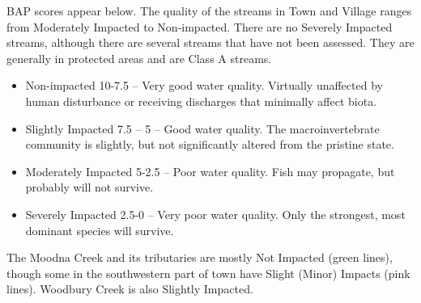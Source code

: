 BAP scores appear below. The quality of the streams in Town and Village ranges 
from Moderately Impacted to Non-impacted. There are no Severely Impacted 
streams, although there are several streams that have not been assessed. They 
are generally in protected areas and are Class A streams.
\begin{itemize}
    \item Non-impacted 10-7.5 – Very good water quality. Virtually unaffected 
    by human disturbance or receiving discharges that minimally affect 
    biota.
    \item Slightly Impacted 7.5 – 5 – Good water quality. The 
    macroinvertebrate community is slightly, but not significantly altered from 
    the pristine state.
    \item Moderately Impacted 5-2.5 – Poor water quality. Fish may propagate, 
    but probably will not survive.
    \item Severely Impacted 2.5-0 – Very poor water quality. Only the 
    strongest, most dominant species will survive.
\end{itemize}

The Moodna Creek and its tributaries are mostly Not Impacted (green lines), 
though some in the southwestern part of town have Slight (Minor) Impacts (pink 
lines). Woodbury Creek is also Slightly Impacted.

\label{map:biomonitoringandprioritywaterbodies}